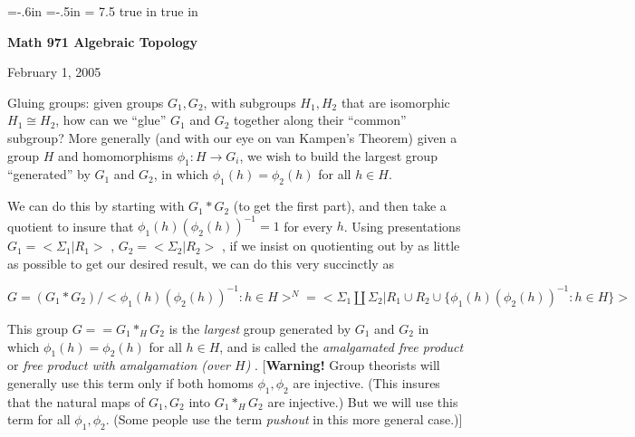 

\overfullrule=0pt
\parindent=0pt

\nopagenumbers



\voffset=-.6in
\hoffset=-.5in
\hsize = 7.5 true in
 true in




\loadmsbm



\def\ctln{\centerline}
\def\u{\underbar}
\def\ssk{\smallskip}
\def\msk{\medskip}
\def\bsk{\bigskip}
\def\hsk{\hskip.1in}
\def\hhsk{\hskip.2in}
\def\dsl{\displaystyle}
\def\hskp{\hskip1.5in}

\def\lra{$\Leftrightarrow$ }
\def\ra{\rightarrow}
\def\mpto{\logmapsto}
\def\pu{\pi_1}
\def\mpu{$\pi_1$}
\def\sig{\Sigma}
\def\msig{$\Sigma$}
\def\ep{\epsilon}
\def\sset{\subseteq}
\def\del{\partial}




\ctln{\bf Math 971 Algebraic Topology}

\ssk

\ctln{February 1, 2005}

\msk


Gluing groups: given groups $G_1,G_2$, with subgroups $H_1,H_2$ that are
isomorphic $H_1\cong H_2$, how can we ``glue'' $G_1$ and $G_2$ together along their
``common'' subgroup? More generally (and with our eye on van Kampen's Theorem)
given a group $H$ and homomorphisms $\phi_1 : H\ra G_i$, we wish to build the largest group ``generated'' by
$G_1$ and $G_2$, in which $\phi_1(h)=\phi_2(h)$ for all $h\in H$. 

\msk

We can do this by starting
with $G_1*G_2$ (to get the first part), and then take a quotient to insure that 
$\phi_1(h)(\phi_2(h))^{-1} =1$ for every $h$. Using presentations 
$G_1=<\sig_1 | R_1>$ , $G_2=<\sig_2 | R_2>$ , if we insist on quotienting out by 
as little as possible to get our desired result, we can do this very succinctly as

\msk

\ctln{$G = (G_1*G_2)/<\phi_1(h)(\phi_2(h))^{-1} : h\in H>^N = 
<\sig_1\coprod\sig_2 | R_1\cup R_2\cup\{\phi_1(h)(\phi_2(h))^{-1} : h\in H\}>$}
 
\msk

This group $G= =G_1*_HG_2$ is the {\it largest} group generated by $G_1$ and $G_2$ in which 
$\phi_1(h)=\phi_2(h)$ for all $h\in H$, and is called the {\it amalgamated 
free product} or {\it free product with amalgamation (over $H$)} . [{\bf Warning!} 
Group theorists will generally use this term only if both homoms $\phi_1,\phi_2$
are injective. (This insures that the natural maps of $G_1,G_2$ into $G_1*_HG_2$
are injective.) But we will use this term for all $\phi_1,\phi_2$. (Some people use the term {\it pushout}
in this more general case.)]

